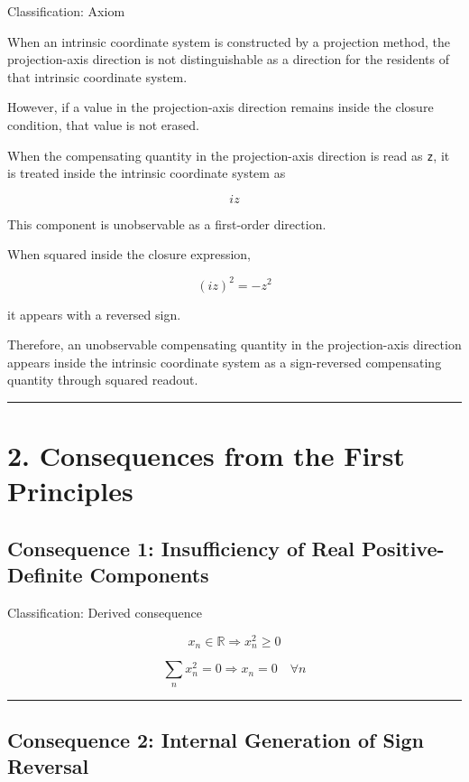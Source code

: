 \documentclass[
  a4paper,
]{article}
\begin{document}
Classification: Axiom

When an intrinsic coordinate system is constructed by a projection
method, the projection-axis direction is not distinguishable as a
direction for the residents of that intrinsic coordinate system.

However, if a value in the projection-axis direction remains inside the
closure condition, that value is not erased.

When the compensating quantity in the projection-axis direction is read
as \texttt{z}, it is treated inside the intrinsic coordinate system as

\[
iz
\]

This component is unobservable as a first-order direction.

When squared inside the closure expression,

\[
(iz)^2=-z^2
\]

it appears with a reversed sign.

Therefore, an unobservable compensating quantity in the projection-axis
direction appears inside the intrinsic coordinate system as a
sign-reversed compensating quantity through squared readout.

\begin{center}\rule{0.5\linewidth}{0.5pt}\end{center}

\section{2. Consequences from the First
Principles}\label{consequences-from-the-first-principles}

\subsection{Consequence 1: Insufficiency of Real Positive-Definite
Components}\label{consequence-1-insufficiency-of-real-positive-definite-components}

Classification: Derived consequence

\[
x_n\in\mathbb{R}
\Rightarrow
x_n^2\ge0
\]

\[
\sum_n x_n^2=0
\Rightarrow
x_n=0\quad\forall n
\]

\begin{center}\rule{0.5\linewidth}{0.5pt}\end{center}

\subsection{Consequence 2: Internal Generation of Sign
Reversal}\label{consequence-2-internal-generation-of-sign-reversal}
\end{document}
